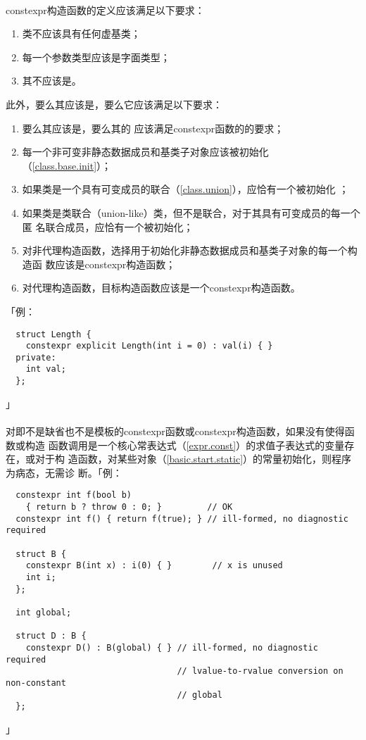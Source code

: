 \paragraph{}
constexpr构造函数的定义应该满足以下要求：
\begin{enumerate}
  \item{类不应该具有任何虚基类；}
  \item{每一个参数类型应该是字面类型；}
  \item{其不应该是。}
\end{enumerate}
此外，要么其应该是，要么它应该满足以下要求：
\begin{enumerate}
  \item{要么其应该是，要么其的
    应该满足constexpr函数的的要求；}
  \item{每一个非可变非静态数据成员和基类子对象应该被初始化
    （\ref{class.base.init}）；}
  \item{如果类是一个具有可变成员的联合（\ref{class.union}），应恰有一个被初始化
    ；}
  \item{如果类是类联合（union-like）类，但不是联合，对于其具有可变成员的每一个匿
    名联合成员，应恰有一个被初始化；}
  \item{对非代理构造函数，选择用于初始化非静态数据成员和基类子对象的每一个构造函
    数应该是constexpr构造函数；}
  \item{对代理构造函数，目标构造函数应该是一个constexpr构造函数。}
\end{enumerate}
「例：
\begin{lstlisting}
  struct Length {
    constexpr explicit Length(int i = 0) : val(i) { }
  private:
    int val;
  };
\end{lstlisting}」

\paragraph{}
对即不是缺省也不是模板的constexpr函数或constexpr构造函数，如果没有使得函数或构造
函数调用是一个核心常表达式（\ref{expr.const}）的求值子表达式的变量存在，或对于构
造函数，对某些对象（\ref{basic.start.static}）的常量初始化，则程序为病态，无需诊
断。「例：
\begin{lstlisting}
  constexpr int f(bool b)
    { return b ? throw 0 : 0; }         // OK
  constexpr int f() { return f(true); } // ill-formed, no diagnostic required

  struct B {
    constexpr B(int x) : i(0) { }        // x is unused
    int i;
  };

  int global;

  struct D : B {
    constexpr D() : B(global) { } // ill-formed, no diagnostic required
                                  // lvalue-to-rvalue conversion on non-constant
                                  // global
  };
\end{lstlisting}」

